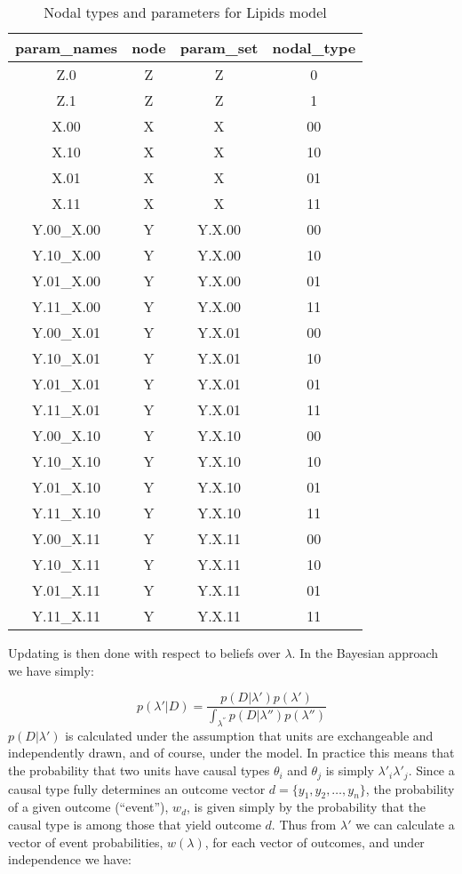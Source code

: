 \documentclass[
  11pt,
  article]{jss}
\begin{document}
\begin{table}

\caption{Nodal types and parameters for Lipids model}
\centering
\begin{tabular}[t]{cccc}
\toprule
param\_names & node & param\_set & nodal\_type\\
\midrule
Z.0 & Z & Z & 0\\
Z.1 & Z & Z & 1\\
X.00 & X & X & 00\\
X.10 & X & X & 10\\
X.01 & X & X & 01\\
X.11 & X & X & 11\\
Y.00\_X.00 & Y & Y.X.00 & 00\\
Y.10\_X.00 & Y & Y.X.00 & 10\\
Y.01\_X.00 & Y & Y.X.00 & 01\\
Y.11\_X.00 & Y & Y.X.00 & 11\\
Y.00\_X.01 & Y & Y.X.01 & 00\\
Y.10\_X.01 & Y & Y.X.01 & 10\\
Y.01\_X.01 & Y & Y.X.01 & 01\\
Y.11\_X.01 & Y & Y.X.01 & 11\\
Y.00\_X.10 & Y & Y.X.10 & 00\\
Y.10\_X.10 & Y & Y.X.10 & 10\\
Y.01\_X.10 & Y & Y.X.10 & 01\\
Y.11\_X.10 & Y & Y.X.10 & 11\\
Y.00\_X.11 & Y & Y.X.11 & 00\\
Y.10\_X.11 & Y & Y.X.11 & 10\\
Y.01\_X.11 & Y & Y.X.11 & 01\\
Y.11\_X.11 & Y & Y.X.11 & 11\\
\bottomrule
\end{tabular}
\end{table}

Updating is then done with respect to beliefs over \(\lambda\). In the
Bayesian approach we have simply:

\[p(\lambda'|D) = \frac{p(D|\lambda')p(\lambda')}{\int_{\lambda^{''}} p(D|\lambda'')p(\lambda'')}\]
\(p(D|\lambda')\) is calculated under the assumption that units are
exchangeable and independently drawn, and of course, under the model. In
practice this means that the probability that two units have causal
types \(\theta_i\) and \(\theta_j\) is simply \(\lambda'_i\lambda'_j\).
Since a causal type fully determines an outcome vector
\(d = \{y_1, y_2,\dots,y_n\}\), the probability of a given outcome
(``event''), \(w_d\), is given simply by the probability that the causal
type is among those that yield outcome \(d\). Thus from \(\lambda'\) we
can calculate a vector of event probabilities, \(w(\lambda)\), for each
vector of outcomes, and under independence we have:
\end{document}
